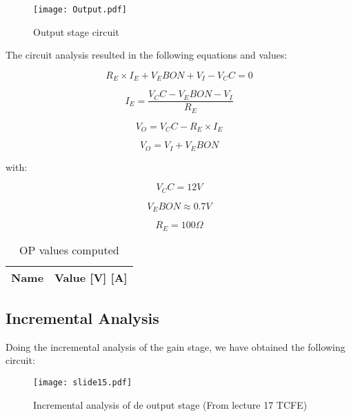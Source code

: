 \begin{figure}[H] \centering
\texttt{[image: Output.pdf]}
\caption{Output stage circuit}
\label{fig:rc2d}
\end{figure}


The circuit analysis resulted in the following equations and values:

\begin{equation}
R_E \times I_E +  V_EBON + V_I - V_CC = 0
\end{equation}

\begin{equation}
I_E = \frac{V_CC - V_EBON - V_I}{R_E}    
\end{equation}

\begin{equation}
V_O = V_CC - R_E \times I_E    
\end{equation}

\begin{equation}
V_O = V_I + V_EBON    
\end{equation}

with:

\begin{equation}
V_CC = 12 V
\end{equation}

\begin{equation}
V_EBON \approx 0.7 V    
\end{equation}

\begin{equation}
R_E = 100 \Omega    
\end{equation}

\vspace{0.3in}
\begin{table}[ht]
  \centering
  \begin{tabular}{|l|r|}
    \hline    
    {\bf Name} & {\bf Value [V] [A]} \\ \hline
    
  \end{tabular}
  \caption{OP values computed}
  \label{tab:op1d}
\end{table}

\subsection{Incremental Analysis}

Doing the incremental analysis of the gain stage, we have obtained the following circuit:


\begin{figure}[h] \centering
\texttt{[image: slide15.pdf]}
\caption{Incremental analysis of de output stage (From lecture 17 TCFE)}
\label{fig:rc2f}
\end{figure} 


